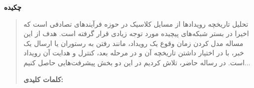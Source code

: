 \thispagestyle{empty}
\centerline{\textbf{\large{چکیده}}}
\begin{quote}
تحلیل تاریخچه رویدادها از مسایل کلاسیک در حوزه فرآیندهای تصادفی است که اخیرا در بستر شبکه‌های پیچیده مورد توجه زیادی قرار گرفته است.  
هدف از این مساله مدل کردن زمان وقوع یک رویداد، مانند رفتن به رستوران یا ارسال یک خبر، با در اختیار داشتن تاریخچه آن و در مرحله بعد، کنترل و هدایت آن رویداد است.
در رساله حاضر، تلاش کردیم در این دو بخش پیشرفت‌هایی حاصل کنیم... 

\vskip 1cm
\textbf{کلمات کلیدی:} 
\end{quote}


